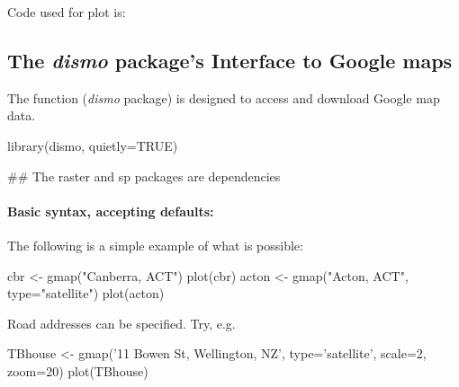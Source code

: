 Code used for plot is:
\begin{Schunk}
\end{Schunk}

\subsection{The {\em dismo} package's Interface to Google maps}

The function  ({\em dismo} package) is designed to 
access and download Google map data.

\begin{Schunk}
\begin{Sinput}
library(dismo, quietly=TRUE)
\end{Sinput}
\begin{Sinput}
  ## The raster and sp packages are dependencies
\end{Sinput}
\end{Schunk}

\paragraph{Basic syntax, accepting defaults:}
The following is a simple example of what is possible:

\begin{Schunk}
\begin{Sinput}
cbr <- gmap("Canberra, ACT")
plot(cbr)
acton <- gmap("Acton, ACT", type="satellite")
plot(acton)
\end{Sinput}
\end{Schunk}
Road addresses can be specified. Try, e.g.
\begin{Schunk}
\begin{Sinput}
TBhouse <- gmap('11 Bowen St, Wellington, NZ',
                type='satellite', scale=2, zoom=20)
plot(TBhouse)
\end{Sinput}
\end{Schunk}

